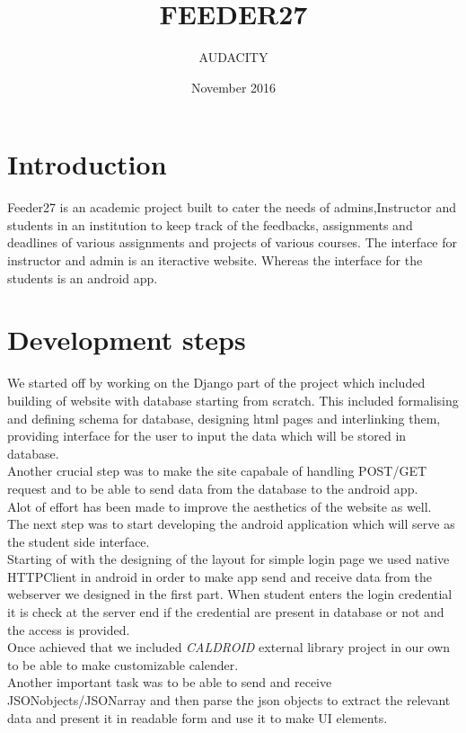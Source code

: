 \documentclass{article}
\title{FEEDER27}
\author{AUDACITY}
\date{November 2016}
\begin{document}
\maketitle

\section{Introduction}
Feeder27 is an academic project built to cater the needs of admins,Instructor and students in an institution to keep track of the feedbacks, assignments and deadlines of various assignments and projects of various courses.
The interface for instructor and admin is an iteractive website. Whereas the interface for the students is an android app.

\section{Development steps}
We started off by working on the Django part of the project which included building of website with database starting from scratch. This included formalising and defining schema for database, designing html pages and interlinking them, providing interface for the user to input the data which will be stored in database.\\
Another crucial step was to make the site capabale of handling POST/GET request and to be able to send data from the database to the android app.\\
Alot of effort has been made to improve the aesthetics of the website as well.\\
The next step was to start developing the android application which will serve as the student side interface.\\
Starting of with the designing of the layout for simple login page we used native HTTPClient in android in order to make app send and receive data from the webserver we designed in the first part. When student enters the login credential it is check at the server end if the credential are present in database or not and the access is provided.\\
Once achieved that we included \emph{CALDROID} external library project in our own to be able to make customizable calender.\\
Another important task was to be able to send and receive JSONobjects/JSONarray and then parse the json objects to extract the relevant data and present it in readable form and use it to make UI elements.
\end{document}
